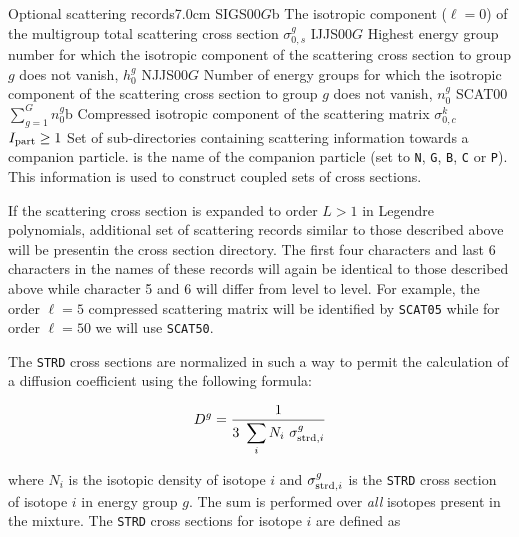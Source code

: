 \begin{DescriptionEnregistrement}{Optional scattering records}{7.0cm}
\label{tabl:tabiso5}
\RealEnr
 {SIGS00}{$G$}{b}
 {The isotropic component ($\ell=0$) of the multigroup total scattering cross
  section
  $\sigma_{0,s}^{g}$}
\IntEnr
  {IJJS00}{$G$}
  {Highest energy group number for which 
   the isotropic component of the scattering cross section to group $g$ does not
   vanish, $h_{0}^{g}$}
\IntEnr
  {NJJS00}{$G$}
  {Number of energy groups for which 
   the isotropic component of the scattering cross section to group $g$ does not
   vanish, $n_{0}^{g}$}
\RealEnr
  {SCAT00}{$\sum_{g=1}^{G} n_{0}^{g}$}{b}
  {Compressed isotropic component of the scattering matrix
   $\sigma_{0,c}^{k}$}
\OptDirVar
  {}{$I_{\rm part}\ge 1$}
  {Set of sub-directories containing scattering information towards a companion particle. 
  is the name of the companion particle (set to {\tt N}, {\tt G}, {\tt B}, {\tt C} or {\tt P}). This information
  is used to construct coupled sets of cross sections.}
\end{DescriptionEnregistrement}

If the scattering cross section is
expanded to order $L>1$ in Legendre polynomials, additional set of scattering
records similar to those described above will be presentin the cross section directory.
The first four characters and last 6 characters in the names of
these records will again be identical to those described above while character 5
and 6 will differ from level to level. For example, the order
$\ell=5$ compressed scattering matrix will be identified by
\texttt{SCAT05} while for order 
$\ell=50$ we will use \texttt{SCAT50}.

\vskip 0.2cm

The {\tt STRD} cross sections are normalized in such a way to permit the
calculation of a diffusion coefficient using the following formula:

\begin{equation}
D^g={\displaystyle 1\over\displaystyle 3 \ \sum_i N_i \ \sigma_{{\rm strd},i}^g}
\end{equation}

\noindent where $N_i$ is the isotopic density of isotope $i$ and $\sigma_{{\rm strd},i}^g$
is the {\tt STRD} cross section of isotope $i$ in energy group $g$. The sum is
performed over {\sl all} isotopes present in the mixture. The {\tt STRD} cross
sections for isotope $i$ are defined as

